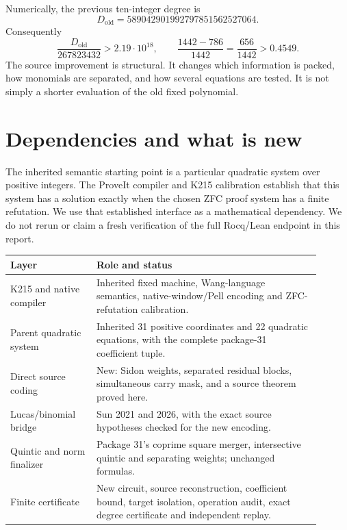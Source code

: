 \documentclass[11pt,letterpaper]{article}
\theoremstyle{definition}\newtheorem{definition}[theorem]{Definition}
\theoremstyle{remark}\newtheorem{remark}[theorem]{Remark}
\begin{document}
Numerically, the previous ten-integer degree is
\[
 D_{\mathrm{old}}=589042901992797851562527064.
\]
Consequently
\[
 \frac{D_{\mathrm{old}}}{267823432}>2.19\cdot10^{18},\qquad
 \frac{1442-786}{1442}=\frac{656}{1442}>0.4549.
\]
The source improvement is structural. It changes which information is packed, how monomials are separated, and how several equations are tested. It is not simply a shorter evaluation of the old fixed polynomial.

\section{Dependencies and what is new}\label{sec:dependencies}

The inherited semantic starting point is a particular quadratic system over positive integers. The ProveIt compiler and K215 calibration establish that this system has a solution exactly when the chosen ZFC proof system has a finite refutation. We use that established interface as a mathematical dependency. We do not rerun or claim a fresh verification of the full Rocq/Lean endpoint in this report.

\begin{center}\small
\begin{tabular}{p{0.25\linewidth}p{0.65\linewidth}}
\toprule
Layer & Role and status\\
\midrule
K215 and native compiler & Inherited fixed machine, Wang-language semantics, native-window/Pell encoding and ZFC-refutation calibration.\\
Parent quadratic system & Inherited 31 positive coordinates and 22 quadratic equations, with the complete package-31 coefficient tuple.\\
Direct source coding & New: Sidon weights, separated residual blocks, simultaneous carry mask, and a source theorem proved here.\\
Lucas/binomial bridge & Sun 2021 and 2026, with the exact source hypotheses checked for the new encoding.\\
Quintic and norm finalizer & Package 31's coprime square merger, intersective quintic and separating weights; unchanged formulas.\\
Finite certificate & New circuit, source reconstruction, coefficient bound, target isolation, operation audit, exact degree certificate and independent replay.\\
\bottomrule
\end{tabular}
\end{center}
\end{document}
